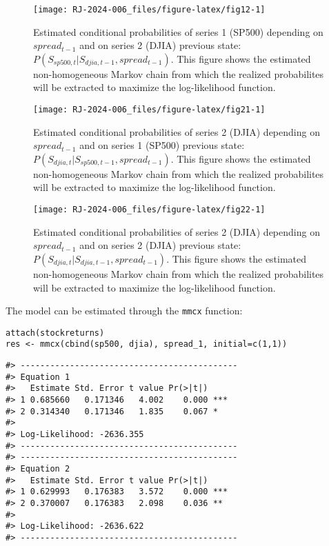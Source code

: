 \begin{figure}

{\centering \texttt{[image: RJ-2024-006\_files/figure-latex/fig12-1]} 

}

\caption{Estimated conditional probabilities of series 1 (SP500) depending on $spread_{t-1}$ and on series 2 (DJIA) previous state: $P(S_{sp500,t} | S_{djia, t-1}, spread_{t-1})$. This figure shows the estimated non-homogeneous Markov chain from which the realized probabilites will be extracted to maximize the log-likelihood function.}\label{fig:fig12}
\end{figure}

\begin{figure}

{\centering \texttt{[image: RJ-2024-006\_files/figure-latex/fig21-1]} 

}

\caption{Estimated conditional probabilities of series 2 (DJIA) depending on $spread_{t-1}$ and on series 1 (SP500) previous state: $P(S_{djia,t} | S_{sp500, t-1}, spread_{t-1})$. This figure shows the estimated non-homogeneous Markov chain from which the realized probabilites will be extracted to maximize the log-likelihood function.}\label{fig:fig21}
\end{figure}

\begin{figure}

{\centering \texttt{[image: RJ-2024-006\_files/figure-latex/fig22-1]} 

}

\caption{Estimated conditional probabilities of series 2 (DJIA) depending on $spread_{t-1}$ and on series 2 (DJIA) previous state: $P(S_{djia,t} | S_{djia, t-1}, spread_{t-1})$. This figure shows the estimated non-homogeneous Markov chain from which the realized probabilites will be extracted to maximize the log-likelihood function.}\label{fig:fig22}
\end{figure}

\newpage

The model can be estimated through the \texttt{mmcx} function:

\begin{verbatim}
attach(stockreturns)
res <- mmcx(cbind(sp500, djia), spread_1, initial=c(1,1))
\end{verbatim}

\begin{verbatim}
#> --------------------------------------------
#> Equation 1 
#>   Estimate Std. Error t value Pr(>|t|)    
#> 1 0.685660   0.171346   4.002    0.000 ***
#> 2 0.314340   0.171346   1.835    0.067 *  
#> 
#> Log-Likelihood: -2636.355 
#> --------------------------------------------
#> --------------------------------------------
#> Equation 2 
#>   Estimate Std. Error t value Pr(>|t|)    
#> 1 0.629993   0.176383   3.572    0.000 ***
#> 2 0.370007   0.176383   2.098    0.036 ** 
#> 
#> Log-Likelihood: -2636.622 
#> --------------------------------------------
\end{verbatim}

